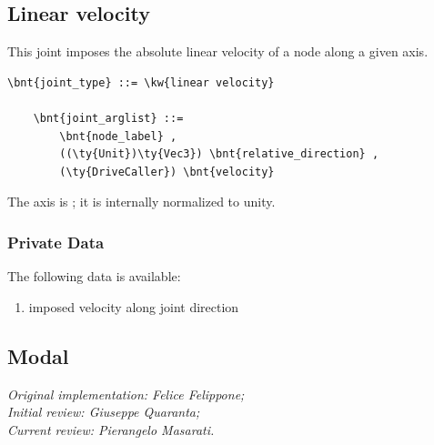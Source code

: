 \subsection{Linear velocity}
This joint imposes the absolute linear velocity of a node
along a given axis.
\begin{Verbatim}[commandchars=\\\{\}]
    \bnt{joint_type} ::= \kw{linear velocity}

    \bnt{joint_arglist} ::=
        \bnt{node_label} ,
        ((\ty{Unit})\ty{Vec3}) \bnt{relative_direction} , 
        (\ty{DriveCaller}) \bnt{velocity}
\end{Verbatim}
The axis is ; it is internally normalized to unity.

\subsubsection{Private Data}
The following data is available:
\begin{enumerate}
\item {} imposed velocity along joint direction
\end{enumerate}

\subsection{Modal}\label{sec:EL:STRUCT:JOINT:MODAL}
\emph{
Original implementation: Felice Felippone; \\
Initial review: Giuseppe Quaranta; \\
Current review: Pierangelo Masarati.}

